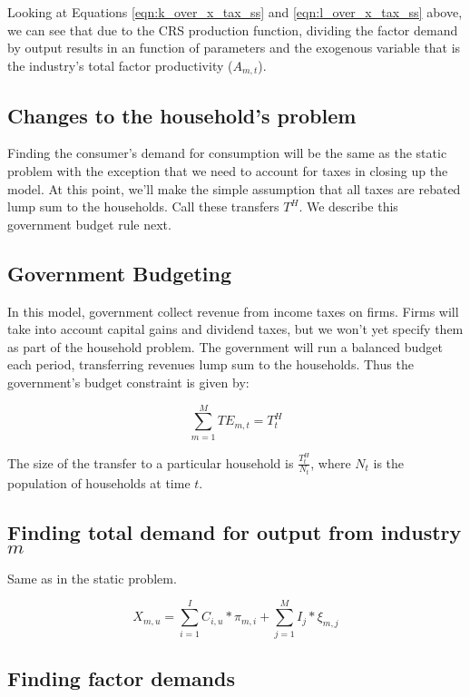 \documentclass[letterpaper,12pt]{article}
\theoremstyle{definition}
\begin{document}
\begin{spacing}{1.5}
Looking at Equations \ref{eqn:k_over_x_tax_ss} and \ref{eqn:l_over_x_tax_ss} above, we can see that due to the CRS production function, dividing the factor demand by output results in an function of parameters and the exogenous variable that is the industry's total factor productivity ($A_{m,t}$).


\subsection*{Changes to the household's problem}

Finding the consumer's demand for consumption will be the same as the static problem with the exception that we need to account for taxes in closing up the model.  At this point, we'll make the simple assumption that all taxes are rebated lump sum to the households.  Call these transfers $T^{H}$.  We describe this government budget rule next.

\subsection*{Government Budgeting}

In this model, government collect revenue from income taxes on firms.  Firms will take into account capital gains and dividend taxes, but we won't yet specify them as part of the household problem.  The government will run a balanced budget each period, transferring revenues lump sum to the households.  Thus the government's budget constraint is given by: 

\begin{equation}
\sum_{m=1}^{M}TE_{m,t} = T^{H}_{t}
\end{equation}

The size of the transfer to a particular household is $\frac{T^{H}_{t}}{N_{t}}$, where $N_{t}$ is the population of households at time $t$.

\subsection*{Finding total demand for output from industry $m$}

Same as in the static problem.

\begin{equation}
\label{eqn:output_demand_dyn_tax_ss}
X_{m,u} = \sum_{i=1}^{I}C_{i,u}*\pi_{m,i} + \sum_{j=1}^{M}I_{j}*\xi_{m,j}
\end{equation}

\subsection*{Finding factor demands}


\end{spacing}
\end{document}
